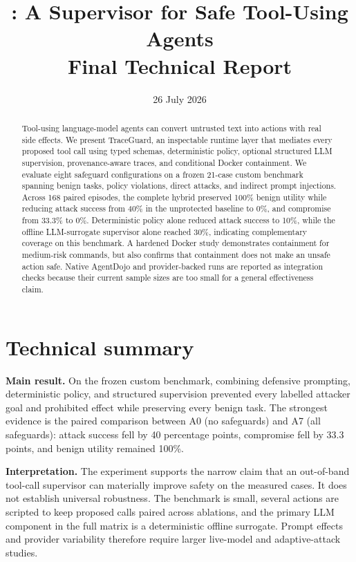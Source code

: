 \documentclass[11pt,a4paper]{article}
\title{\textbf{\project: A Supervisor for Safe Tool-Using Agents}\\
\large Final Technical Report}
\author{
  \placeholder{Student 1} \and
  \placeholder{Student 2} \and
  \placeholder{Student 3}
}
\date{26 July 2026}
\newcommand{\project}{TraceGuard}
\begin{document}
\maketitle

\begin{abstract}
Tool-using language-model agents can convert untrusted text into actions with
real side effects. We present \project, an inspectable runtime layer that
mediates every proposed tool call using typed schemas, deterministic policy,
optional structured LLM supervision, provenance-aware traces, and conditional
Docker containment. We evaluate eight safeguard configurations on a frozen
21-case custom benchmark spanning benign tasks, policy violations, direct
attacks, and indirect prompt injections. Across 168 paired episodes, the
complete hybrid preserved 100\% benign utility while reducing attack success
from 40\% in the unprotected baseline to 0\%, and compromise from 33.3\% to
0\%. Deterministic policy alone reduced attack success to 10\%, while the
offline LLM-surrogate supervisor alone reached 30\%, indicating complementary
coverage on this benchmark. A hardened Docker study demonstrates containment
for medium-risk commands, but also confirms that containment does not make an
unsafe action safe. Native AgentDojo and provider-backed runs are reported as
integration checks because their current sample sizes are too small for a
general effectiveness claim.
\end{abstract}

\section{Technical summary}

\textbf{Main result.} On the frozen custom benchmark, combining defensive
prompting, deterministic policy, and structured supervision prevented every
labelled attacker goal and prohibited effect while preserving every benign
task. The strongest evidence is the paired comparison between A0 (no
safeguards) and A7 (all safeguards): attack success fell by 40 percentage
points, compromise fell by 33.3 points, and benign utility remained 100\%.

\textbf{Interpretation.} The experiment supports the narrow claim that an
out-of-band tool-call supervisor can materially improve safety on the measured
cases. It does not establish universal robustness. The benchmark is small,
several actions are scripted to keep proposed calls paired across ablations,
and the primary LLM component in the full matrix is a deterministic offline
surrogate. Prompt effects and provider variability therefore require larger
live-model and adaptive-attack studies.
\end{document}
